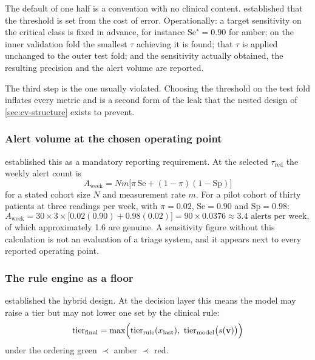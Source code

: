 \documentclass[12pt,a4paper,oneside]{report}
\begin{document}
The default of one half is a convention with no clinical content.  established that the threshold is set from the cost of error. Operationally: a target sensitivity on the critical class is fixed in advance, for instance $\mathrm{Se}^\star = 0.90$ for amber; on the inner validation fold the smallest $\tau$ achieving it is found; that $\tau$ is applied unchanged to the outer test fold; and the sensitivity actually obtained, the resulting precision and the alert volume are reported.

The third step is the one usually violated. Choosing the threshold on the test fold inflates every metric and is a second form of the leak that the nested design of \cref{sec:cv-structure} exists to prevent.

\subsubsection{Alert volume at the chosen operating point}

 established this as a mandatory reporting requirement. At the selected $\tau_{\text{red}}$ the weekly alert count is
\begin{equation}
  A_{\text{week}} = N m \bigl[\pi\,\mathrm{Se} + (1-\pi)(1-\mathrm{Sp})\bigr]
\end{equation}
for a stated cohort size $N$ and measurement rate $m$. For a pilot cohort of thirty patients at three readings per week, with $\pi = 0.02$, $\mathrm{Se} = 0.90$ and $\mathrm{Sp} = 0.98$:
\begin{equation}
  A_{\text{week}} = 30 \times 3 \times \bigl[0.02(0.90) + 0.98(0.02)\bigr]
  = 90 \times 0.0376 \approx 3.4 \text{ alerts per week},
\end{equation}
of which approximately 1.6 are genuine. A sensitivity figure without this calculation is not an evaluation of a triage system, and it appears next to every reported operating point.

\subsubsection{The rule engine as a floor}\label{sec:rule-floor}

 established the hybrid design. At the decision layer this means the model may raise a tier but may not lower one set by the clinical rule:
\begin{equation}
  \text{tier}_{\text{final}} = \max\Bigl(\text{tier}_{\text{rule}}(x_{\text{last}}),\ \text{tier}_{\text{model}}\bigl(s(\mathbf{v})\bigr)\Bigr)
\end{equation}
under the ordering green $\prec$ amber $\prec$ red.
\end{document}
